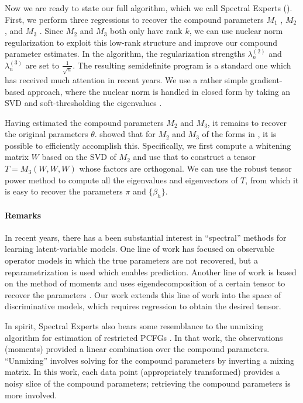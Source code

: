 Now we are ready to state our full algorithm, which we call Spectral Experts
().
First, we perform three regressions to recover the compound parameters
$M_1$ ,
$M_2$ , and
$M_3$ .
Since $M_2$ and $M_3$ both only have rank $k$,
we can use nuclear norm regularization
\cite{Tomioka2011,NegahbanWainwright2009}
to exploit this low-rank structure and improve our compound parameter estimates.
In the algorithm, the regularization strengths $\lambda_n^{(2)}$ and $\lambda_n^{(3)}$
are set to $\frac{1}{\sqrt{n}}$.
The resulting semidefinite program is a standard one which has received
much attention in recent years.
We use a rather simple gradient-based approach,
where the nuclear norm is handled in closed form by taking an SVD
and soft-thresholding the eigenvalues \cite{donoho95soft,cai10soft}.

Having estimated the compound parameters $M_2$ and $M_3$,
it remains to recover the original parameters $\theta$.
\citet{AnandkumarGeHsu2012} showed that for $M_2$ and $M_3$ of
the forms in , it is possible to efficiently accomplish this.
Specifically, we first compute a whitening matrix $W$ based on the SVD of $M_2$
and use that to construct a tensor $T = M_3(W, W, W)$ whose factors are orthogonal.
We can use the robust tensor power method to compute all the
eigenvalues and eigenvectors of $T$, from which it is easy to recover
the parameters $\pi$ and $\{\beta_h\}$.

\paragraph{Remarks}

In recent years, there has a been substantial interest in ``spectral'' methods
for learning latent-variable models.  One line of work has
focused on observable operator models \cite{hsu09spectral}
in which the true parameters are not recovered, but a reparametrization is used
which enables prediction.
Another line of work is based on the method of moments and uses eigendecomposition of a certain tensor
to recover the parameters \cite{anandkumar12svd,anandkumar12moments,AnandkumarHsuKakade2012}.
Our work extends this line of work into the space of discriminative models,
which requires regression to obtain the desired tensor.

In spirit, Spectral Experts also bears some resemblance to the unmixing
algorithm for estimation of restricted PCFGs
\cite{hsu12identifiability}.
In that work, the observations (moments) provided a linear combination over
the compound parameters.  ``Unmixing'' involves solving for the compound
parameters by inverting a mixing matrix.  In this work,
each data point (appropriately transformed) provides a noisy slice of the
compound parameters; retrieving the compound parameters is more involved.

